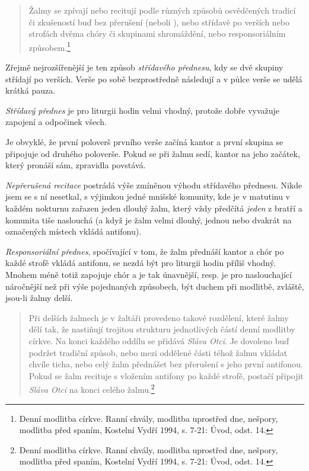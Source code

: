 \begin{quote}
Žalmy se zpívají nebo recitují podle různých způsobů osvědčených tradicí
či zkušeností buď bez přerušení (neboli ),
nebo střídavě po verších nebo strofách dvěma chóry či skupinami
shromáždění, nebo responsoriálním způsobem.\footnote{Denní modlitba církve. Ranní chvály, modlitba uprostřed dne, nešpory, modlitba před spaním, Kostelní Vydří 1994, s. 7-21: Úvod, odst. 14.}
\end{quote}

Zřejmě nejrozšířenější je ten způsob \emph{střídavého přednesu}, 
kdy se dvě skupiny střídají po verších. Verše po sobě bezprostředně následují a 
v půlce verše se udělá krátká pauza.

\emph{Střídavý přednes} je pro liturgii hodin velmi vhodný, protože dobře 
vyvažuje zapojení a odpočinek všech.

Je obvyklé, že první poloverš prvního verše začíná kantor a první skupina
se připojuje od druhého poloverše. Pokud se při žalmu sedí, kantor
na jeho začátek, který pronáší sám, zpravidla povstává.

\emph{Nepřerušená recitace} postrádá výše zmíněnou výhodu střídavého přednesu.
Nikde jsem se s ní nesetkal, s výjimkou jedné mnišské komunity, kde je
v matutinu v každém nokturnu zařazen jeden dlouhý žalm, který vždy předčítá
\emph{jeden} z bratří a komunita tiše naslouchá (a když je žalm velmi dlouhý, 
jednou nebo dvakrát na označených místech vkládá antifonu).

\emph{Responsoriální přednes}, spočívající v tom, že žalm přednáší kantor
a chór po každé strofě vkládá antifonu, se nezdá být pro liturgii hodin
příliš vhodný. Mnohem méně totiž zapojuje chór a je tak únavnější,
resp. je pro naslouchající náročnější než při výše pojednaných způsobech,
být duchem při modlitbě, zvláště, jsou-li žalmy delší.

\begin{quote}
Při delších žalmech je v žaltáři provedeno takové rozdělení, které žalmy
dělí tak, že nastiňují trojitou strukturu jednotlivých částí denní modlitby 
církve.
Na konci každého oddílu se přidává \emph{Sláva Otci}.
Je dovoleno buď podržet tradiční způsob, nebo mezi oddělené části téhož žalmu
vkládat chvíle ticha, nebo celý žalm přednášet bez přerušení s jeho první
antifonou. Pokud se žalm recituje s vložením antifony po každé strofě,
postačí připojit \emph{Sláva Otci} na konci celého žalmu.\footnote{Denní modlitba církve. Ranní chvály, modlitba uprostřed dne, nešpory, modlitba před spaním, Kostelní Vydří 1994, s. 7-21: Úvod, odst. 14.}
\end{quote}

